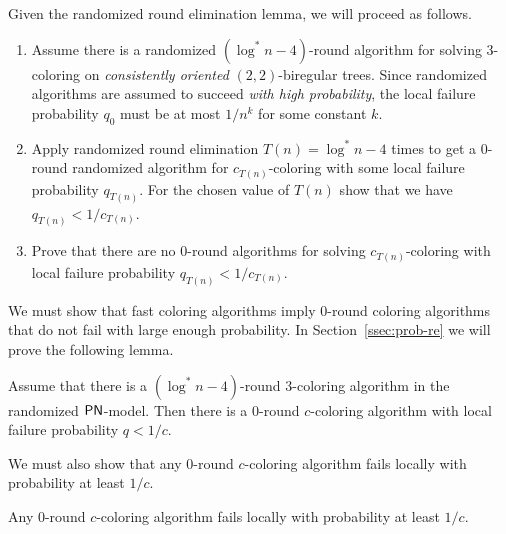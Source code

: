 Given the randomized round elimination lemma, we will proceed as follows.
\begin{enumerate}[label=(\arabic*)]
	\item Assume there is a randomized $(\log^* n - 4)$-round algorithm for solving 3-coloring on \emph{consistently oriented} $(2,2)$-biregular trees. Since randomized algorithms are assumed to succeed \emph{with high probability}, the local failure probability $q_0$ must be at most $1/n^k$ for some constant $k$.
	\item Apply randomized round elimination $T(n) = \log^* n - 4$ times to get a $0$-round randomized algorithm for $c_{T(n)}$-coloring with some local failure probability $q_{T(n)}$. For the chosen value of $T(n)$ show that we have $q_{T(n)} < 1/c_{T(n)}$. \label{item:part2}
	\item Prove that there are no 0-round algorithms for solving $c_{T(n)}$-coloring with local failure probability $q_{T(n)} < 1/c_{T(n)}$. \label{item:part3} 
\end{enumerate}

We must show that fast coloring algorithms imply 0-round coloring algorithms that do not fail with large enough probability. In Section~\ref{ssec:prob-re} we will prove the following lemma.

\begin{lemma} \label{lem:color-re}
	Assume that there is a $(\log^* n - 4)$-round 3-coloring algorithm in the randomized $\textup{\sffamily PN}$-model. Then there is a 0-round $c$-coloring algorithm with local failure probability $q < 1/c$.
\end{lemma}

We must also show that any 0-round $c$-coloring algorithm fails locally with probability at least $1/c$.

\begin{lemma} \label{lem:0round-ccol}
	Any 0-round $c$-coloring algorithm fails locally with probability at least $1/c$.
\end{lemma}

